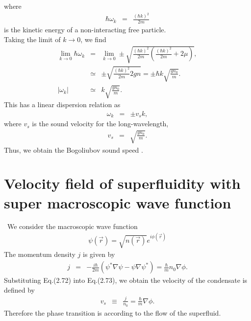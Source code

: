 \documentclass[12pt,a4paper]{report} %
\begin{document}
where
\begin{eqnarray}
\hbar \omega_k & = & \frac{(\hbar k)^2}{2m}
\end{eqnarray}
is the kinetic energy of a non-interacting free particle.
\\
Taking the limit of $k \rightarrow 0$, we find
\begin{eqnarray}
\lim_{k \rightarrow 0} \hbar \omega_k & = & \lim_{k \rightarrow 0} \pm \sqrt{\frac{(\hbar k)^2}{2m} \left( \frac{(\hbar k)^2}{2m} + 2\mu \right)},
\\
& \simeq & \pm \sqrt{\frac{(\hbar k)^2}{2m} 2 g n} = \pm \hbar k \sqrt{\frac{gn_0}{m}}.
\\
|\omega_k| & \simeq & k \sqrt{\frac{gn_0}{m}}.
\end{eqnarray}
This has a linear dispersion relation as
\begin{eqnarray}
\omega_k & = & \pm v_s k,
\end{eqnarray}
where $v_s$ is the sound velocity for the long-wavelength,
\\
\begin{eqnarray}
v_s & = & \sqrt{\frac{g n_0}{m}}.
\end{eqnarray}
Thus, we obtain the Bogoliubov sound speed \cite{18}.
%

\section{Velocity field of superfluidity with super macroscopic wave function}
\ We consider the macroscopic wave function 
\begin{eqnarray}
\psi(\vec{r}) = \sqrt{n(\vec{r})} e^{i \phi(\vec{r})}
\end{eqnarray}
The momentum density $j$ is given by
\begin{eqnarray}
j & = & - \frac{i \hbar}{2m} \left( \psi^* \nabla \psi - \psi \nabla \psi^* \right) = \frac{\hbar}{m} n_0 \nabla \phi.
\end{eqnarray}
Substituting Eq.(2.72) into Eq.(2.73),
we obtain the velocity of the condensate is defined by 
\begin{eqnarray}
v_{s} & \equiv & \frac{j}{n_0} = \frac{\hbar}{m} \nabla \phi.
\end{eqnarray}
Therefore the phase transition is according to the flow of the superfluid.
\fi
\end{document}
